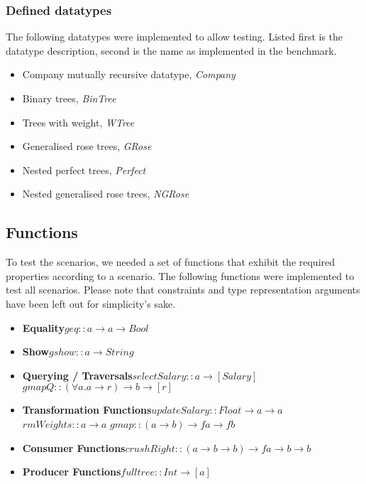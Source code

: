 \documentclass[twocolumn,11pt,a4paper]{article}
\begin{document}
\subsubsection{Defined datatypes}
The following datatypes were implemented to allow testing.
Listed first is the datatype description, second is the name as implemented in the benchmark.
\begin{itemize}
\item Company mutually recursive datatype, \textit{Company}
\item Binary trees, \textit{BinTree}
\item Trees with weight, \textit{WTree}
\item Generalised rose trees, \textit{GRose}
\item Nested perfect trees, \textit{Perfect}
\item Nested generalised rose trees, \textit{NGRose}
\end{itemize}

\subsection{Functions}
To test the scenarios, we needed a set of functions that exhibit the required properties according to a scenario. The following functions were implemented to test all scenarios. Please note that constraints and type representation arguments have been left out for simplicity's sake.
\begin{itemize}
\item \textbf{Equality}\newline $ geq :: a \rightarrow a \rightarrow Bool $
\item \textbf{Show}\newline $ gshow :: a \rightarrow String $
\item \textbf{Querying / Traversals}\newline $ selectSalary :: a \rightarrow [Salary] $ \newline
$ gmapQ :: (\forall a. a \rightarrow r) \rightarrow b \rightarrow [r] $
\item \textbf{Transformation Functions}\newline $ updateSalary :: Float \rightarrow a \rightarrow a $ \newline $ rmWeights :: a \rightarrow a $ \newline $ gmap :: (a \rightarrow b) \rightarrow f a \rightarrow f b $
\item \textbf{Consumer Functions}\newline $ crushRight :: (a \rightarrow b \rightarrow b) \rightarrow f a \rightarrow b \rightarrow b $ 
\item \textbf{Producer Functions}\newline $ fulltree ::  Int \rightarrow [a] $ 
\end{itemize}
\end{document}
